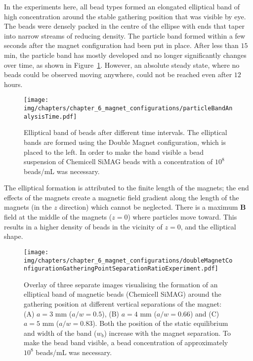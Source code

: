 In the experiments here, all bead types formed an elongated elliptical band of high concentration around the stable gathering position that was visible by eye. The beads were densely packed in the centre of the ellipse with ends that taper into narrow streams of reducing density. The particle band formed within a few seconds after the magnet configuration had been put in place. After less than $15$ min, the particle band has mostly developed and no longer significantly changes over time, as shown in Figure~\ref{fig:particleBandAnalysisTime}. However, an absolute steady state, where no beads could be observed moving anywhere, could not be reached even after $12$ hours.

\begin{figure}[htb]
	\centering
	\texttt{[image: img/chapters/chapter\_6\_magnet\_configurations/particleBandAnalysisTime.pdf]}
	\caption[Elliptical band of beads after various time intervals]{Elliptical band of beads after different time intervals. The elliptical bands are formed using the Double Magnet configuration, which is placed to the left. In order to make the band visible a bead suspension of Chemicell SiMAG beads with a concentration of $10^8$ beads/mL was necessary.}
	\label{fig:particleBandAnalysisTime}
\end{figure}

The elliptical formation is attributed to the finite length of the magnets; the end effects of the magnets create a magnetic field gradient along the length of the magnets (in the $z$ direction) which cannot be neglected. There is a maximum $\mathbf{B}$ field at the middle of the magnets ($z=0$) where particles move toward. This results in a higher density of beads in the vicinity of $z=0$, and the elliptical shape.

\begin{figure}[htb]
   \centering
   \texttt{[image: img/chapters/chapter\_6\_magnet\_configurations/doubleMagnetConfigurationGatheringPointSeparationRatioExperiment.pdf]}
   \caption[Experimental visualisation of the elliptical particle band and gathering positions for different vertical separations]{Overlay of three separate images visualising the formation of an elliptical band of magnetic beads (Chemicell SiMAG) around the gathering position at different vertical separations of the magnet: (A) $a=3$ mm ($a/w = 0.5$), (B) $a=4$ mm ($a/w = 0.66$) and (C) $a=5$ mm ($a/w = 0.83$). Both the position of the static equilibrium  and width of the band ($w_{b}$) increase with the magnet separation. To make the bead band visible, a bead concentration of approximately $10^8$ beads/mL was necessary.}
   \label{fig:doubleMagnetConfigurationGatheringPointSeparationRatioExperiment}
\end{figure}

